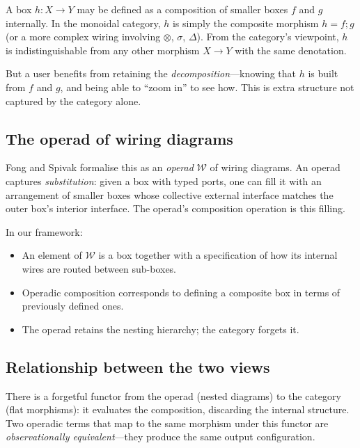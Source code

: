 \documentclass[11pt]{article}
\newcommand{\tensor}{\otimes}
\newcommand{\comp}{\mathbin{;}}
\begin{document}
    A box $h \colon X \to Y$ may be defined as a composition of smaller boxes $f$ and $g$
    internally. In the monoidal category, $h$ is simply the composite morphism $h = f
    \comp g$ (or a more complex wiring involving $\tensor$, $\sigma$, $\Delta$). From the
    category's viewpoint, $h$ is indistinguishable from any other morphism $X \to Y$ with
    the same denotation.

    But a user benefits from retaining the \emph{decomposition}---knowing that $h$ is
    built from $f$ and $g$, and being able to ``zoom in'' to see how. This is extra
    structure not captured by the category alone.

    \subsection{The operad of wiring diagrams}

    Fong and Spivak \cite[Chapter~2]{fong2019invitation} formalise this as an
    \emph{operad} $\mathcal{W}$ of wiring diagrams. An operad captures
    \emph{substitution}: given a box with typed ports, one can fill it with an arrangement
    of smaller boxes whose collective external interface matches the outer box's interior
    interface. The operad's composition operation is this filling.

    In our framework:
    \begin{itemize}
        \item An element of $\mathcal{W}$ is a box together with a specification of how
        its internal wires are routed between sub-boxes.
        \item Operadic composition corresponds to defining a composite box in terms of
        previously defined ones.
        \item The operad retains the nesting hierarchy; the category forgets it.
    \end{itemize}

    \subsection{Relationship between the two views}

    There is a forgetful functor from the operad (nested diagrams) to the category (flat
    morphisms): it evaluates the composition, discarding the internal structure. Two
    operadic terms that map to the same morphism under this functor are
    \emph{observationally equivalent}---they produce the same output configuration.
\end{document}
